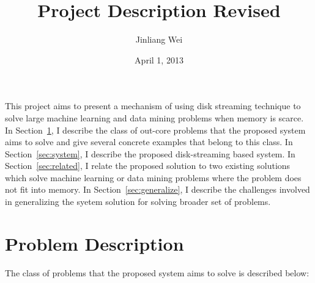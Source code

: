 \documentclass[10pt, twocolumn, a4paper]{article}
\title{\Large \bf Project Description Revised}
\author{Jinliang Wei}
\date{April 1, 2013}
\begin{document}
\maketitle

This project aims to present a mechanism of using disk streaming technique to solve large machine learning and data mining problems when memory is scarce. In Section~\ref{sec:problem}, I describe the class of out-core problems that the proposed system aims to solve and give several concrete examples that belong to this class. In Section~\ref{sec:system}, I describe the proposed disk-streaming based system. In Section~\ref{sec:related}, I relate the proposed solution to two existing solutions which solve machine learning or data mining problems where the problem does not fit into memory. In Section~\ref{sec:generalize}, I describe the challenges involved in generalizing the syetem solution for solving broader set of problems.

\section{Problem Description}
\label{sec:problem}
The class of problems that the proposed system aims to solve is described below:
\end{document}
